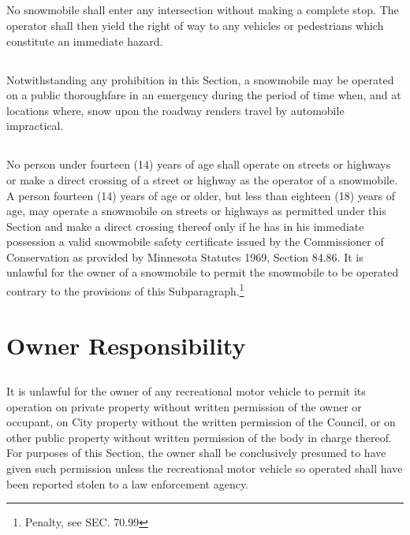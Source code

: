 \subsection{}
No snowmobile shall enter any intersection without making a complete stop. The operator shall then yield the right of way to any vehicles or pedestrians which constitute an immediate hazard.
\subsection{}
Notwithstanding any prohibition in this Section, a snowmobile may be operated on a public thoroughfare in an emergency during the period of time when, and at locations where, snow upon the roadway renders travel by automobile impractical.
\subsection{}
No person under fourteen (14) years of age shall operate on streets or highways or make a direct crossing of a street or highway as the operator of a snowmobile. A person fourteen (14) years of age or older, but less than eighteen (18) years of age, may operate a snowmobile on streets or highways as permitted under this Section and make a direct crossing thereof only if he has in his immediate possession a valid snowmobile safety certificate issued by the Commissioner of Conservation as provided by Minnesota Statutes 1969, Section 84.86. It is unlawful for the owner of a snowmobile to permit the snowmobile to be operated contrary to the provisions of this Subparagraph.\footnote{Penalty, see SEC. 70.99}

\section{Owner Responsibility}
\subsection{}
It is unlawful for the owner of any recreational motor vehicle to permit its operation on private property without written permission of the owner or occupant, on City property without the written permission of the Council, or on other public property without written permission of the body in charge thereof. For purposes of this Section, the owner shall be conclusively presumed to have given such permission unless the recreational motor vehicle so operated shall have been reported stolen to a law enforcement agency.
